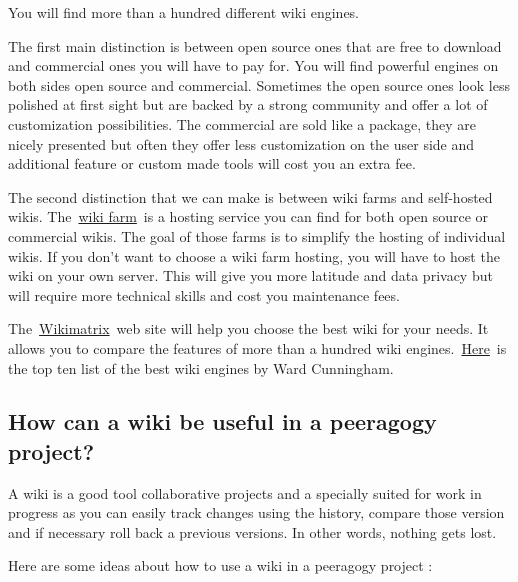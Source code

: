 You will find more than a hundred different wiki engines.

The first main distinction is between open source ones that are free to
download and commercial ones you will have to pay for. You will find
powerful engines on both sides open source and commercial. Sometimes the
open source ones look less polished at first sight but are backed by a
strong community and offer a lot of customization possibilities. The
commercial are sold like a package, they are nicely presented but often
they offer less customization on the user side and additional feature or
custom made tools will cost you an extra fee.

The second distinction that we can make is between wiki farms and
self-hosted wikis.
The~\href{http://en.wikipedia.org/wiki/Wiki_hosting_service}{wiki
farm}~is a hosting service you can find for both open source or
commercial wikis. The goal of those farms is to simplify the hosting of
individual wikis. If you don't want to choose a wiki farm hosting, you
will have to host the wiki on your own server. This will give you more
latitude and data privacy but will require more technical skills and
cost you maintenance fees.

The~\href{http://www.wikimatrix.org/}{Wikimatrix}~web site will help you
choose the best wiki for your needs. It allows you to compare the
features of more than a hundred wiki
engines.~\href{http://c2.com/cgi/wiki?TopTenWikiEngines}{Here}~is the
top ten list of the best wiki engines by Ward Cunningham.

\subsection{How can a wiki be useful in a peeragogy
project?}\label{how-can-a-wiki-be-useful-in-a-peeragogy-project}

A wiki is a good tool collaborative projects and a specially suited for
work in progress as you can easily track changes using the history,
compare those version and if necessary roll back a previous versions. In
other words, nothing gets lost.

Here are some ideas about how to use a wiki in a peeragogy project :

